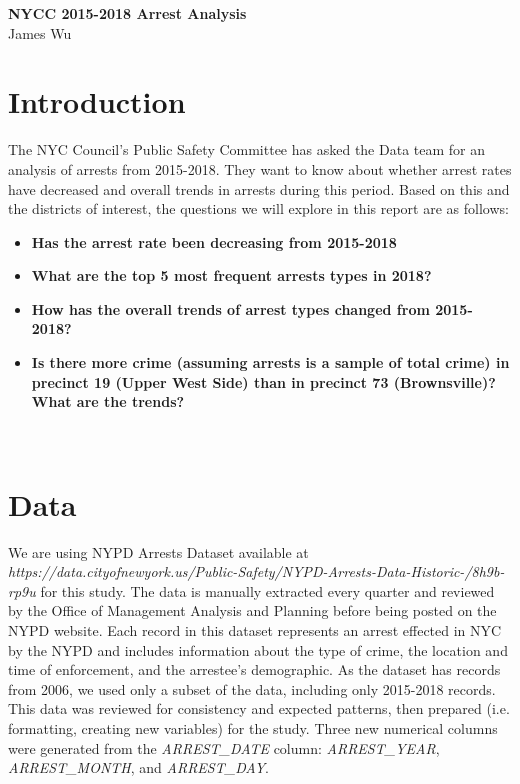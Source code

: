 \documentclass[11pt]{article}\usepackage[]{graphicx}\usepackage[]{color}
\begin{document}
\begin{center}
\textbf{NYCC 2015-2018 Arrest Analysis}\\
\normalsize{James Wu}
\end{center}

\section{Introduction}
The NYC Council's Public Safety Committee has asked the Data team for an analysis of arrests from 2015-2018. They want to know about whether arrest rates have decreased and overall trends in arrests during this period. Based on this and the districts of interest, the questions we will explore in this report are as follows:
\begin{itemize}
  \item \textbf{Has the arrest rate been decreasing from 2015-2018}
  \item \textbf{What are the top 5 most frequent arrests types in 2018?}
  \item \textbf{How has the overall trends of arrest types changed from 2015-2018?}
  \item \textbf{Is there more crime (assuming arrests is a sample of total crime) in precinct 19 (Upper West Side) than in precinct 73 (Brownsville)? What are the trends?}
\end{itemize}
\\

\section{Data}
We are using NYPD Arrests Dataset available at \emph{https://data.cityofnewyork.us/Public-Safety/NYPD-Arrests-Data-Historic-/8h9b-rp9u} for this study. The data is manually extracted every quarter and reviewed by the Office of Management Analysis and Planning before being posted on the NYPD website. Each record in this dataset represents an arrest effected in NYC by the NYPD and includes information about the type of crime, the location and time of enforcement, and the arrestee's demographic. As the dataset has records from 2006, we used only a subset of the data, including only 2015-2018 records. This data was reviewed for consistency and expected patterns, then prepared (i.e. formatting, creating new variables) for the study. Three new numerical columns were generated from the \textit{ARREST\_DATE} column: \textit{ARREST\_YEAR}, \textit{ARREST\_MONTH}, and \textit{ARREST\_DAY}.
\end{document}
